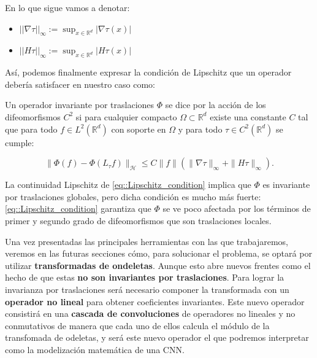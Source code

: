 \noindent En lo que sigue vamos a denotar: 

\begin{itemize}
  \item $||\nabla \tau ||_\infty := \sup_{x \in \mathbb{R}^d} |\nabla \tau(x)|$
  \item $||H \tau ||_\infty := \sup_{x \in \mathbb{R}^d} |H \tau(x)|$ 
\end{itemize}

\medskip

\noindent Así, podemos finalmente expresar la condición de Lipschitz que un operador debería satisfacer en nuestro caso como: 


\medskip

\begin{definicion} \label{def::Lipschitz_cont}
\noindent Un operador invariante por traslaciones $\Phi$ se dice  por la acción de los difeomorfismos $C^2$  si para cualquier compacto $\Omega \subset \mathbb{R}^d$ existe una constante $C$ tal que para todo $f \in L^2(\mathbb{R}^d)$ con soporte en $\Omega$ y para todo $\tau \in C^2(\mathbb{R}^d)$ se cumple:

\begin{equation} \label{eq::Lipschitz_condition}
  \| \Phi(f)-\Phi(L_{\tau}f)\|_\mathcal{H} \leq C\|f\|(\|\nabla\tau\|_{\infty} + \|H \tau\|_\infty).
\end{equation}
\end{definicion}

\medskip

\noindent La continuidad Lipschitz de \eqref{eq::Lipschitz_condition} implica que $\Phi$ es invariante por traslaciones globales, pero dicha condición es mucho más fuerte: \eqref{eq::Lipschitz_condition} garantiza que $\Phi$ se ve poco afectada por los términos de primer y segundo grado de difeomorfismos que son traslaciones locales.

\medskip


\noindent Una vez presentadas las principales herramientas con las que trabajaremos, veremos en las futuras secciones cómo, para solucionar el problema, se optará por utilizar \textbf{transformadas de ondeletas}. Aunque esto abre nuevos frentes como el hecho de que estas \textbf{no son invariantes por traslaciones}. Para lograr la invarianza por traslaciones será necesario componer la transformada con un \textbf{operador no lineal} para obtener coeficientes invariantes. Este nuevo operador consistirá en una \textbf{cascada de convoluciones} de operadores no lineales y no conmutativos de manera que cada uno de ellos calcula el módulo de la transfomada de odeletas, y será este nuevo operador el que podremos interpretar como la modelización matemática de una CNN.


\endinput
